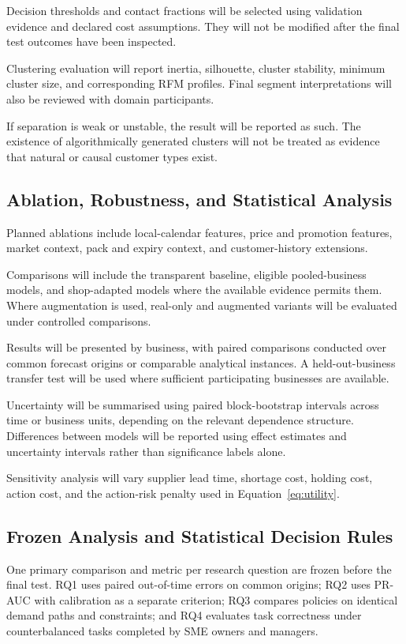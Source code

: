 \documentclass[a4paper,11pt,oneside]{book}
\theoremstyle{plain}
\theoremstyle{definition}
\theoremstyle{remark}
\begin{document}
Decision thresholds and contact fractions will be selected using validation
evidence and declared cost assumptions. They will not be modified after the
final test outcomes have been inspected.

Clustering evaluation will report inertia, silhouette, cluster stability,
minimum cluster size, and corresponding RFM profiles. Final segment
interpretations will also be reviewed with domain participants.

If separation is weak or unstable, the result will be reported as such. The
existence of algorithmically generated clusters will not be treated as evidence
that natural or causal customer types exist.


\subsection{Ablation, Robustness, and Statistical Analysis}
\label{subsec:ablation_robustness}

Planned ablations include local-calendar features, price and promotion features,
market context, pack and expiry context, and customer-history extensions.

Comparisons will include the transparent baseline, eligible pooled-business
models, and shop-adapted models where the available evidence permits them.
Where augmentation is used, real-only and augmented variants will be evaluated
under controlled comparisons.

Results will be presented by business, with paired comparisons conducted over
common forecast origins or comparable analytical instances. A held-out-business
transfer test will be used where sufficient participating businesses are
available.

Uncertainty will be summarised using paired block-bootstrap intervals across
time or business units, depending on the relevant dependence structure.
Differences between models will be reported using effect estimates and
uncertainty intervals rather than significance labels alone.

Sensitivity analysis will vary supplier lead time, shortage cost, holding cost,
action cost, and the action-risk penalty used in
Equation~\ref{eq:utility}.


\subsection{Frozen Analysis and Statistical Decision Rules}
\label{subsec:frozen_analysis_rules}
One primary comparison and metric per research question are frozen before
the final test. RQ1 uses paired out-of-time errors on common origins; RQ2
uses PR-AUC with calibration as a separate criterion; RQ3 compares policies
on identical demand paths and constraints; and RQ4 evaluates task correctness
under counterbalanced tasks completed by SME owners and managers.
\end{document}
